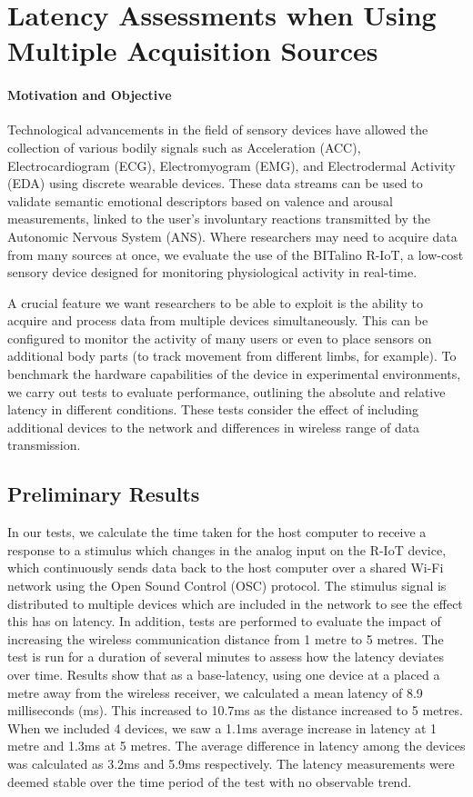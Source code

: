 \section{Latency Assessments when Using Multiple Acquisition Sources}

\paragraph{Motivation and Objective}

Technological advancements in the field of sensory devices have allowed the collection of various bodily signals such as Acceleration (ACC), Electrocardiogram (ECG), Electromyogram (EMG), and Electrodermal Activity (EDA) using discrete wearable devices. These data streams can be used to validate semantic emotional descriptors based on valence and arousal measurements, linked to the user’s involuntary reactions transmitted by the Autonomic Nervous System (ANS). Where researchers may need to acquire data from many sources at once, we evaluate the use of the BITalino R-IoT, a low-cost sensory device designed for monitoring physiological activity in real-time.

A crucial feature we want researchers to be able to exploit is the ability to acquire and process data from multiple devices simultaneously. This can be configured to monitor the activity of many users or even to place sensors on additional body parts (to track movement from different limbs, for example). To benchmark the hardware capabilities of the device in experimental environments, we carry out tests to evaluate performance, outlining the absolute and relative latency in different conditions. These tests consider the effect of including additional devices to the network and differences in wireless range of data transmission.

\subsection{Preliminary Results}

In our tests, we calculate the time taken for the host computer to receive a response to a stimulus which changes in the analog input on the R-IoT device, which continuously sends data back to the host computer over a shared Wi-Fi network using the Open Sound Control (OSC) protocol. The stimulus signal is distributed to multiple devices which are included in the network to see the effect this has on latency. In addition, tests are performed to evaluate the impact of increasing the wireless communication distance from 1 metre to 5 metres. The test is run for a duration of several minutes to assess how the latency deviates over time.
Results show that as a base-latency, using one device at a placed a metre away from the wireless receiver, we calculated a mean latency of 8.9 milliseconds (ms). This increased to 10.7ms as the distance increased to 5 metres. When we included 4 devices, we saw a 1.1ms average increase in latency at 1 metre and 1.3ms at 5 metres. The average difference in latency among the devices was calculated as 3.2ms and 5.9ms respectively. The latency measurements were deemed stable over the time period of the test with no observable trend.

